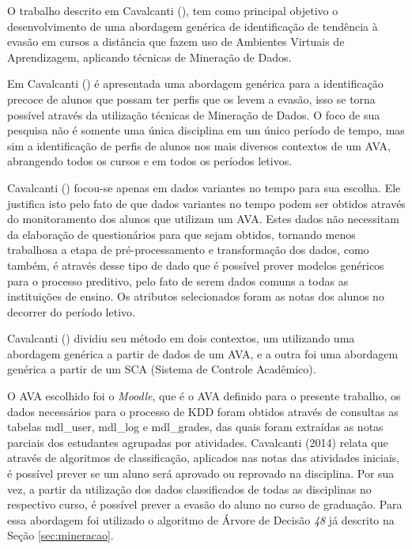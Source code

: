 \label{ref:santos}

O trabalho descrito em Cavalcanti (\citeyear{cavalcantimineraccao}), tem como principal objetivo o
desenvolvimento de uma abordagem genérica de identificação de tendência à evasão em cursos a distância que fazem uso de Ambientes Virtuais de Aprendizagem, aplicando técnicas de Mineração de Dados.

Em Cavalcanti (\citeyear{cavalcantimineraccao}) é apresentada uma abordagem genérica para a identificação precoce de alunos que possam ter perfis que os levem a evasão, isso se torna possível através da utilização técnicas de Mineração de Dados. O foco de sua pesquisa não é somente uma única disciplina em um único período de tempo, mas sim a identificação de perfis de alunos nos mais diversos contextos de um AVA, abrangendo todos os cursos e em todos os períodos letivos.

Cavalcanti (\citeyear{cavalcantimineraccao}) focou-se apenas em dados variantes no tempo para sua escolha. Ele justifica isto pelo fato de que dados variantes no tempo podem ser obtidos através do monitoramento dos alunos que utilizam um AVA. Estes dados não necessitam da elaboração de questionários para que sejam obtidos, tornando menos trabalhosa a etapa de pré-processamento e transformação dos dados, como também, é através desse tipo de dado que é possível prover modelos genéricos para o processo preditivo, pelo fato de serem dados comuns a todas as instituições de ensino. Os atributos selecionados foram as notas dos alunos no decorrer do período letivo.

Cavalcanti (\citeyear{cavalcantimineraccao}) dividiu seu método em dois contextos, um utilizando uma abordagem genérica a partir de dados de um AVA, e a outra foi uma abordagem genérica a partir de um SCA (Sistema de Controle Acadêmico).

O AVA escolhido foi o \textit{Moodle}, que é o AVA definido para o presente trabalho, os dados necessários para o processo de KDD foram obtidos através de consultas as tabelas mdl\_user, mdl\_log e mdl\_grades, das quais foram extraídas as notas parciais dos estudantes agrupadas por atividades. Cavalcanti (2014) relata que através de algoritmos de classificação, aplicados nas notas das atividades iniciais, é possível prever se um aluno será aprovado ou reprovado na disciplina. Por sua vez, a partir da utilização dos dados classificados de todas as disciplinas no respectivo curso, é possível prever a evasão do aluno no curso de graduação. Para essa abordagem foi utilizado o algoritmo de Árvore de Decisão \textit{48} já descrito na Seção \ref{sec:mineracao}.

